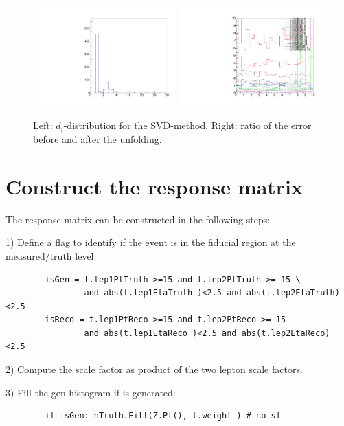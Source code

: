 \documentclass[a4paper,11pt]{article}
\begin{document}
\begin{figure}[H]
	\centering
	\includegraphics[width=0.49\textwidth]{figs/unfold-svd-ddistr.pdf}
	\includegraphics[width=0.49\textwidth]{figs/unfold-error-reg.pdf}
	\caption{ \label{fig:sol:reg2} Left: $d_i$-distribution for the \gls{SVD}-method. Right: ratio of the error before and after the unfolding.}
\end{figure}

\FloatBarrier
\section{Construct the response matrix}

The response matrix can be constructed in the following steps:

1)  Define a flag to identify if the event is in the fiducial region at the measured/truth level:
\begin{verbatim}
        isGen = t.lep1PtTruth >=15 and t.lep2PtTruth >= 15 \  
                and abs(t.lep1EtaTruth )<2.5 and abs(t.lep2EtaTruth) <2.5
        isReco = t.lep1PtReco >=15 and t.lep2PtReco >= 15  
                and abs(t.lep1EtaReco )<2.5 and abs(t.lep2EtaReco) <2.5
\end{verbatim}

2) Compute the scale factor as product of the two lepton scale factors.

3) Fill the gen histogram if is generated:
\begin{verbatim}
        if isGen: hTruth.Fill(Z.Pt(), t.weight ) # no sf
\end{verbatim}
\end{document}
